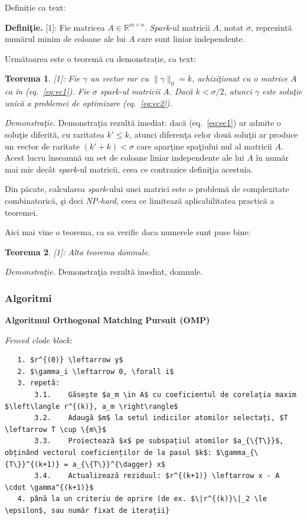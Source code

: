 \documentclass[]{article}
\newtheorem{theorem}{Teorema}
\begin{document}
Definiție ca text:

\textbf{Definiţie.} {[}1{]}: Fie matricea
\(A \in \mathbb{R}^{m \times n}\). \emph{Spark}-ul matricii \(A\), notat
\(\sigma\), reprezintă numărul minim de coloane ale lui \(A\) care sunt
liniar independente.

Următoarea este o teoremă cu demonstrație, ca text:

\begin{theorem}

{[}1{]}: Fie \(\gamma\) un vector rar cu \(\|\gamma\|_0 = k\),
achiziţionat cu o matrice \(A\) ca în (eq.~\ref{eq:ec1}). Fie \(\sigma\)
\emph{spark}-ul matricii \(A\). Dacă \(k < \sigma / 2\), atunci
\(\gamma\) este soluţie unică a problemei de optimizare
(eq.~\ref{eq:ec2}).

\end{theorem}

\emph{Demonstraţie.} Demonstraţia rezultă imediat: dacă
(eq.~\ref{eq:ec1}) ar admite o soluţie diferită, cu raritatea
\(k' \leq k\), atunci diferenţa celor două soluţii ar produce un vector
de raritate \((k'+k) < \sigma\) care aparţine spaţiului nul al matricii
\(A\). Acest lucru înseamnă un set de coloane liniar independente ale
lui \(A\) în număr mai mic decât \emph{spark}-ul matricii, ceea ce
contrazice definiţia acestuia.

Din păcate, calcularea \emph{spark}-ului unei matrici este o problemă de
complexitate combinatorică, şi deci \emph{NP-hard}, ceea ce limitează
aplicabilitatea practică a teoremei.

Aici mai vine o teorema, ca sa verific daca numerele sunt puse bine:

\begin{theorem}

{[}1{]}: Alta teorema domnule.

\end{theorem}

\emph{Demonstraţie.} Demonstraţia rezultă imediat, domnule.

\subsubsection{Algoritmi}\label{algoritmi}

\textbf{Algoritmul Orthogonal Matching Pursuit (OMP)}

\emph{Fenced clode block}:

\begin{verbatim}
   1. $r^{(0)} \leftarrow y$
   2. $\gamma_i \leftarrow 0, \forall i$
   3. repetă:  
       3.1.    Găsește $a_m \in A$ cu coeficientul de corelația maxim $\left\langle r^{(k)}, a_m \right\rangle$  
       3.2.    Adaugă $m$ la setul indicilor atomilor selectați, $T \leftarrow T \cup \{m\}$  
       3.3.    Proiectează $x$ pe subspațiul atomilor $a_{\{T\}}$, obținând vectorul coeficienților de la pasul $k$: $\gamma_{\{T\}}^{(k+1)} = a_{\{T\}}^{\dagger} x$  
       3.4.    Actualizează reziduul: $r^{(k+1)} \leftarrow x - A \cdot \gamma^{(k+1)}$
   4. până la un criteriu de oprire (de ex. $\|r^{(k)}\|_2 \le \epsilon$, sau număr fixat de iterații}  
\end{verbatim}
\end{document}

